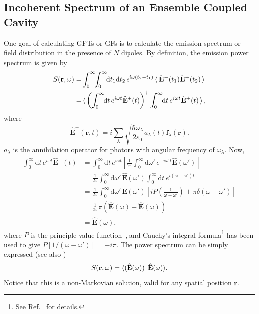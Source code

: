 \subsection{Incoherent Spectrum of an Ensemble Coupled Cavity}
One goal of calculating GFTs or GFs is to calculate the emission spectrum or field distribution in the presence of $N$ dipoles.
By definition, the emission power spectrum is given by
\begin{equation}
 \label{spectrumdef}
\begin{split}
S(\mathbf{r},\omega) =& \int_0^\infty \!\! \int_0^\infty\!\!
\mathrm{d}t_1\mathrm{d}t_2 \, e^{i\omega(t_2-t_1)}\mathinner{\langle}\hat{\mathbf{E}}^-(t_1)\hat{\mathbf{E}}^+(t_2)\mathinner{\rangle} \\
=& \mathinner{\langle} \left( \int_0^\infty \!\! \mathrm{d}t \, e^{i \omega t} \hat{\mathbf{E}}^+(t) \right)^{\dagger} \, \int_0^\infty \! \!
\mathrm{d}t \, e^{i\omega t} \hat{\mathbf{E}}^+(t) \mathinner{\rangle},
\end{split}
\end{equation}
where
\begin{equation}
 \label{eq:E^plus}
 \mathbf{\hat{E}}^+(\mathbf{r},t)
 =i\sum_\lambda\sqrt{\frac{\hbar\omega_\lambda}{2\varepsilon_0}}a_\lambda(t)\mathbf{f}_\lambda(\mathbf{r}).
\end{equation}
$a_\lambda$ is the annihilation operator for photons with angular frequency of $\omega_\lambda$.
Now,
\begin{align}
\int_0^\infty \! \mathrm{d} t \, e^{i\omega t} \hat{\mathbf{E}}^+(t) &= \int_0^\infty \! \mathrm{d}t \, e^{i\omega t}
\left[ \frac{1}{2\pi} \int_0^\infty \mathrm{d}\omega' \, e^{-i\omega' t} \mathbf{\hat{E}}(\omega')\right]  \nonumber\\
&= \frac{1}{2 \pi} \int_0^\infty \!\! \mathrm{d}\omega' \, \mathbf{\hat{E}}(\omega') \int_0^\infty \!\! \mathrm{d}t \, e^{i(\omega-\omega') t} \nonumber\\
&= \frac{1}{2\pi} \int_0^\infty \! \mathrm{d}\omega' \, \mathbf{E}(\omega')\left[iP(\frac{1}{\omega-\omega'})+\pi\delta(\omega-\omega')\right] \label{specP} \\
&= \frac{1}{2\pi}\pi(\mathbf{\hat{E}}(\omega)+\mathbf{\hat{E}}(\omega))\nonumber\\
&= \mathbf{\hat{E}}(\omega),
\end{align}
where $ P $ is the principle value function~\cite{Carmichael2007}, and Cauchy's integral formula\footnote{See Ref.~\cite{VanVlack2012} for details.} has been used to give $P[1/(\omega-\omega')]=-i\pi$.
The power spectrum can be simply expressed (see also \cite{Hughes2009})
\begin{equation}\label{eq:spectrum}
 S({\bf r},\omega)=\langle
(\mathbf{\hat{E}}(\omega))^{\dagger}\mathbf{\hat{E}}(\omega)\rangle.
\end{equation}
Notice that this is a non-Markovian solution, valid for any spatial position $\mathbf{r}$.

